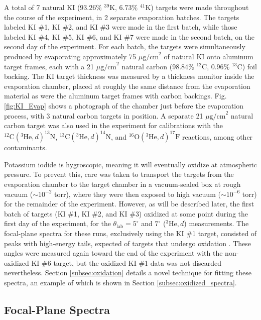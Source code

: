 A total of 7 natural KI ($93.26\%$ $^{39}$K, $6.73\%$ $^{41}$K) targets were made throughout the course of the experiment, in 2 separate evaporation batches. The targets labeled KI $\#$1, KI $\#$2, and KI $\#$3 were made in the first batch, while those labeled KI $\#$4, KI $\#$5, KI $\#$6, and KI $\#$7 were made in the second batch, on the second day of the experiment. For each batch, the targets were simultaneously produced by evaporating approximately 75 $\mu\mathrm{g/cm}^{2}$ of natural KI onto aluminum target frames, each with a 21 $\mu\mathrm{g/cm}^{2}$ natural carbon ($98.84\%$ $^{12}$C, $0.96\%$ $^{13}$C) foil backing. The KI target thickness was measured by a thickness monitor inside the evaporation chamber, placed at roughly the same distance from the evaporation material as were the aluminum target frames with carbon backings. Fig. \ref{fig:KI_Evap} shows a photograph of the chamber just before the evaporation process, with 3 natural carbon targets in position. A separate 21 $\mu\mathrm{g/cm}^{2}$ natural carbon target was also used in the experiment for calibrations with the $^{12}\mathrm{C}(^{3}\mathrm{He},d)^{13}\mathrm{N}$, $^{13}\mathrm{C}(^{3}\mathrm{He},d)^{14}\mathrm{N}$, and $^{16}\mathrm{O}(^{3}\mathrm{He},d)^{17}\mathrm{F}$ reactions, among other contaminants.

Potassium iodide is hygroscopic, meaning it will eventually oxidize at atmospheric pressure. To prevent this, care was taken to transport the targets from the evaporation chamber to the target chamber in a vacuum-sealed box at rough vacuum ($\sim 10^{-2}$ torr), where they were then exposed to high vacuum ($\sim 10^{-6}$ torr) for the remainder of the experiment. However, as will be described later, the first batch of targets (KI $\#$1, KI $\#$2, and KI $\#$3) oxidized at some point during the first day of the experiment, for the $\theta_{\mathrm{lab}} = 5^{\circ}$ and $7^{\circ}$ ($^{3}\mathrm{He},d$) measurements. The focal-plane spectra for these runs, exclusively using the KI $\#$1 target, consisted of peaks with high-energy tails, expected of targets that undergo oxidation \cite{Landau1944}. These angles were measured again toward the end of the experiment with the non-oxidized KI $\#$6 target, but the oxidized KI $\#$1 data was not discarded nevertheless. Section \ref{subsec:oxidation} details a novel technique for fitting these spectra, an example of which is shown in Section \ref{subsec:oxidized_spectra}.

\subsection{Focal-Plane Spectra}

